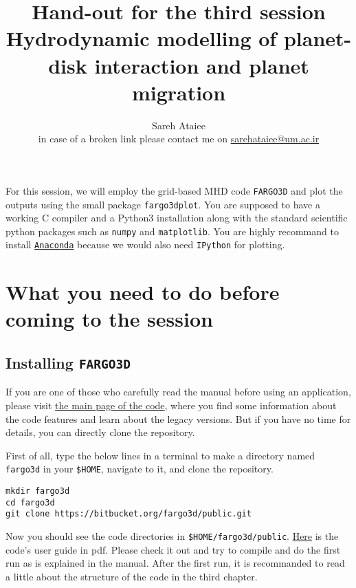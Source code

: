 \documentclass[14pt]{scrartcl}
\title{{\large Hand-out for the third session} \\ Hydrodynamic modelling of planet-disk interaction and planet migration}
\author{{\large Sareh Ataiee} \\ {\normalsize in case of a broken link please contact me on \href{mailto:sarehataiee@um.ac.ir}{sarehataiee@um.ac.ir}} }
\date{}
\begin{document}
\maketitle

For this session, we will employ the grid-based MHD code \texttt{FARGO3D} and plot the outputs using the small package \texttt{fargo3dplot}. You are supposed to have a working C compiler and a Python3 installation along with the standard scientific python packages such as \texttt{numpy} and \texttt{matplotlib}.  You are highly recommand to install \href{https://www.anaconda.com/}{\texttt{Anaconda}} because we would also need  \texttt{IPython} for plotting.

\section{What you need to do before coming to the session} \label{sec:before}
\subsection{Installing \texttt{FARGO3D}} \label{fargo3d}

If you are one of those who carefully read the manual before using an application, please visit \href{http://fargo.in2p3.fr/}{the main page of the code}, where you find some information about the code features and learn about the legacy versions. But if you have no time for details, you can directly clone the repository. 
	
First of all, type the below lines in a terminal to make a directory named \texttt{fargo3d} in your \verb!$HOME!, navigate to it, and clone the repository.	
\begin{verbatim}
mkdir fargo3d
cd fargo3d
git clone https://bitbucket.org/fargo3d/public.git
\end{verbatim}

Now you should see the code directories in \verb!$HOME/fargo3d/public!. \href{http://fargo.in2p3.fr/manuals/FARGO3DUserGuide.pdf}{Here} is the code's user guide in pdf. Please check it out and try to compile and do the first run as is explained in the manual. After the first run, it is recommanded to read a little about the structure of the code in the third chapter. 
\end{document}
